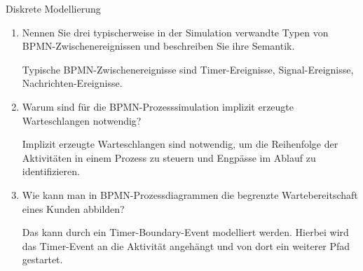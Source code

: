 \documentclass{article}
\begin{document}
\begin{exercise}{Diskrete Modellierung}
\begin{enumerate}
    \item Nennen Sie drei typischerweise in der Simulation verwandte Typen von BPMN-Zwischenereignissen und beschreiben Sie ihre Semantik.
          \begin{solution}
            Typische BPMN-Zwischenereignisse sind Timer-Ereignisse, Signal-Ereignisse, Nachrichten-Ereignisse.
          \end{solution}

    \item Warum sind für die BPMN-Prozesssimulation implizit erzeugte Warteschlangen notwendig?
          \begin{solution}
            Implizit erzeugte Warteschlangen sind notwendig, um die Reihenfolge der Aktivitäten in einem Prozess zu steuern und Engpässe im Ablauf zu identifizieren.
          \end{solution}

    \item Wie kann man in BPMN-Prozessdiagrammen die begrenzte Wartebereitschaft eines Kunden abbilden?
          \begin{solution}
            Das kann durch ein Timer-Boundary-Event modelliert werden. Hierbei wird das Timer-Event an die Aktivität angehängt und von dort ein weiterer Pfad gestartet.
          \end{solution}
  \end{enumerate}
\end{exercise}
\end{document}
